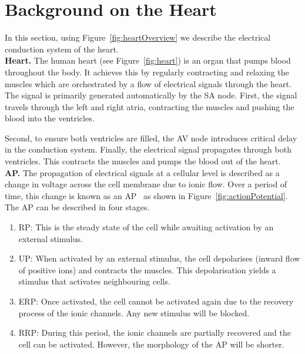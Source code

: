 \section{Background on the Heart }
\begin{figure*}[htbp]
	\centering
	
	\caption{Electrical conduction systems of the heart}
	\label{fig:heartOverview}
\end{figure*}

In this section, using Figure~\ref{fig:heartOverview} we 
describe the electrical conduction system of the heart.\\

\noindent \textbf{Heart.}
The human heart (see Figure~\ref{fig:heart})
 is an organ that pumps blood throughout the body.
It achieves this by regularly contracting and relaxing the muscles
which are orchestrated by a flow of electrical signals through the heart.
The signal is primarily generated automatically by the \ac{SA} node.
First, the signal travels through the left and right atria, contracting 
the muscles and pushing the blood into the ventricles.
 
Second, to ensure both ventricles are filled, 
the \ac{AV} node introduces critical delay 
in the conduction system.   
Finally, the electrical signal propagates through 
both ventricles. This contracts the muscles and pumps the blood out of the heart.
\\

\noindent \textbf{\acf{AP}.} 
The propagation of electrical signals at a cellular level 
is described as a change in  voltage 
across the cell membrane due to ionic flow. Over a period of time, 
this change is known as an \acf{AP}~\cite{chen14} as shown in Figure~\ref{fig:actionPotential}. 
The \ac{AP} can be described in four stages.
\begin{enumerate}
	\item \acf{RP}: This is the steady state of the cell while awaiting 
					activation by an external stimulus.
	\item \acf{UP}: When activated by an external stimulus, 
					the cell depolarises (inward flow of positive ions) and 
					contracts the muscles. This depolarisation yields 
					a stimulus that activates neighbouring cells.
	\item \acf{ERP}: Once activated, the cell cannot be activated again 
					 due to the recovery process of the ionic channels. 
					 Any new stimulus will be blocked. 
	\item \acf{RRP}: During this period, the ionic channels are partially recovered
					 and the cell can be activated. However, the morphology
					 of the \ac{AP} will be shorter.\\
	
\end{enumerate}


